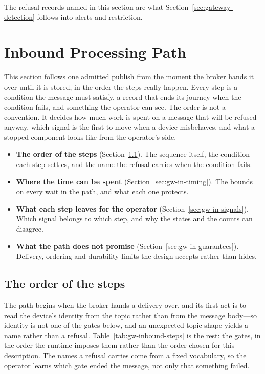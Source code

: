 \documentclass[12pt,a4paper]{report}
\begin{document}
The refusal records named in this section are what
Section~\ref{sec:gateway-detection} follows into alerts and
restriction.

\section{Inbound Processing Path}
\label{sec:gateway-inbound}

This section follows one admitted publish from the moment the broker
hands it over until it is stored, in the order the steps really
happen. Every step is a condition the message must satisfy, a record
that ends its journey when the condition fails, and something the
operator can see. The order is not a convention. It decides how much
work is spent on a message that will be refused anyway, which signal
is the first to move when a device misbehaves, and what a stopped
component looks like from the operator's side.

\begin{itemize}
    \item \textbf{The order of the steps}
    (Section~\ref{sec:gw-in-order}).
    The sequence itself, the condition each step settles, and the name
    the refusal carries when the condition fails.
    \item \textbf{Where the time can be spent}
    (Section~\ref{sec:gw-in-timing}).
    The bounds on every wait in the path, and what each one protects.
    \item \textbf{What each step leaves for the operator}
    (Section~\ref{sec:gw-in-signals}).
    Which signal belongs to which step, and why the states and the
    counts can disagree.
    \item \textbf{What the path does not promise}
    (Section~\ref{sec:gw-in-guarantees}).
    Delivery, ordering and durability limits the design accepts rather
    than hides.
\end{itemize}

\subsection{The order of the steps}
\label{sec:gw-in-order}

The path begins when the broker hands a delivery over, and its first
act is to read the device's identity from the topic rather than from
the message body---so identity is not one of the gates below, and an
unexpected topic shape yields a name rather than a refusal.
Table~\ref{tab:gw-inbound-steps} is the rest: the gates, in the order
the runtime imposes them rather than the order chosen for this
description. The names a refusal carries come from a fixed vocabulary,
so the operator learns which gate ended the message, not only that
something failed.
\end{document}
